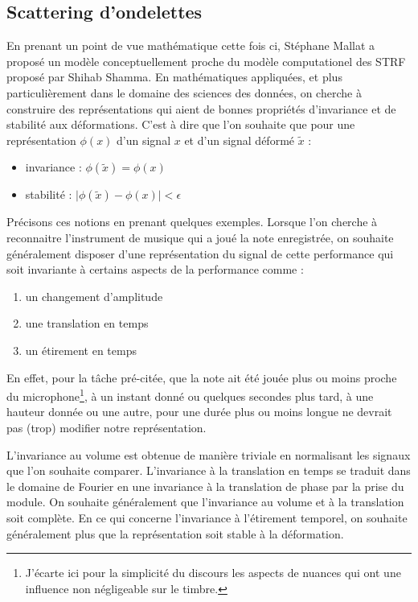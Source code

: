 \subsection{\nmu Scattering d'ondelettes}  \label{sec:scattering}

En prenant un point de vue mathématique cette fois ci, Stéphane Mallat a proposé un modèle conceptuellement proche du modèle computationel des STRF proposé par Shihab Shamma. En mathématiques appliquées, et plus particulièrement dans le domaine des sciences des données, on cherche à construire des représentations qui aient de bonnes propriétés d'invariance et de stabilité aux déformations. C'est à dire que l'on souhaite que pour une représentation $\phi(x)$ d'un signal $x$ et d'un signal déformé $\tilde x$ :
\begin{itemize}
  \item invariance : $\phi(\tilde x) = \phi(x)$
  \item stabilité : $ \vert \phi(\tilde x) - \phi(x) | < \epsilon $
\end{itemize}

Précisons ces notions en prenant quelques exemples. Lorsque l'on cherche à reconnaitre l'instrument de musique qui a joué la note enregistrée, on souhaite généralement disposer d'une représentation du signal de cette performance qui soit invariante à certains aspects de la performance comme :
\begin{enumerate}
  \item un changement d'amplitude
  \item une translation en temps
  \item un étirement en temps
\end{enumerate}
En effet, pour la tâche pré-citée, que la note ait été jouée plus ou moins proche du microphone\footnote{J'écarte ici pour la simplicité du discours les aspects de nuances qui ont une influence non négligeable sur le timbre.}, à un instant donné ou quelques secondes plus tard, à une hauteur donnée ou une autre, pour une durée plus ou moins longue ne devrait pas (trop) modifier notre représentation.

L'invariance au volume est obtenue de manière triviale en normalisant les signaux que l'on souhaite comparer. L'invariance à la translation en temps se traduit dans le domaine de Fourier en une invariance à la translation de phase par la prise du module. On souhaite généralement que l'invariance au volume et à la translation soit complète. En ce qui concerne l'invariance à l'étirement temporel, on souhaite généralement plus que la représentation soit stable à la déformation.

